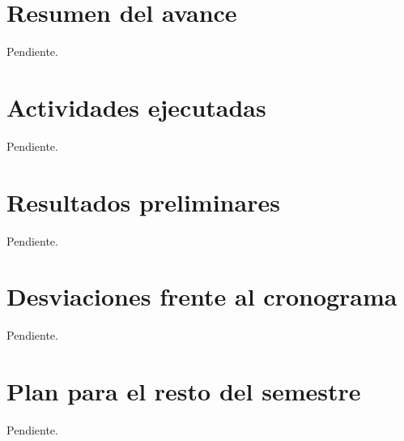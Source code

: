 \documentclass[11pt,letterpaper]{article}
\begin{document}


\singlespacing
\tableofcontents
\clearpage
\onehalfspacing

\setcounter{page}{1}

\section{Resumen del avance}
Pendiente.

\section{Actividades ejecutadas}
Pendiente.

\section{Resultados preliminares}
Pendiente.

\section{Desviaciones frente al cronograma}
Pendiente.

\section{Plan para el resto del semestre}
Pendiente.


\end{document}

